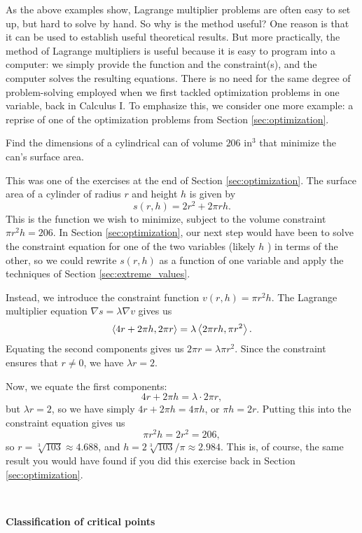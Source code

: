 As the above examples show, Lagrange multiplier problems are often easy to set up, but hard to solve by hand. So why is the method useful? One reason is that it can be used to establish useful theoretical results. But more practically, the method of Lagrange multipliers is useful because it is easy to program into a computer: we simply provide the function and the constraint(s), and the computer solves the resulting equations. There is no need for the same degree of problem-solving employed when we first tackled optimization problems in one variable, back in Calculus I. To emphasize this, we consider one more example: a reprise of one of the optimization problems from Section \ref{sec:optimization}.\pagebreak

{
Find the dimensions of a cylindrical can of volume $206 \text{ in}^3$ that minimize the can's surface area.
}
{
This was one of the exercises at the end of Section \ref{sec:optimization}. The surface area of a cylinder of radius $r$ and height $h$ is given by
\[
s(r,h) = 2r^2+2\pi rh.
\]
This is the function we wish to minimize, subject to the volume constraint $\pi r^2 h = 206$. In Section \ref{sec:optimization}, our next step would have been to solve the constraint equation for one of the two variables (likely $h$ ) in terms of the other, so we could rewrite $s(r,h)$ as a function of one variable and apply the techniques of Section \ref{sec:extreme_values}.

Instead, we introduce the constraint function $v(r,h)= \pi r^2 h$. The Lagrange multiplier equation $\nabla s = \lambda \nabla v$ gives us
\[
\left\langle 4r+2\pi h, 2\pi r\right\rangle = \lambda\left\langle 2\pi r h, \pi r^2\right\rangle.
\]
Equating the second components gives us $2\pi r = \lambda\pi r^2$. Since the constraint ensures that $r\neq 0$, we have $\lambda r = 2$.

Now, we equate the first components:
\[
4r+2\pi h = \lambda \cdot 2\pi r,
\]
but $\lambda r =2$, so we have simply $4r+2\pi h = 4\pi h$, or $\pi h = 2r$. Putting this into the constraint equation gives us
\[
\pi r^2 h = 2r^2 = 206,
\]
so $r=\sqrt[3]{103}\approx 4.688$, and $h=2\sqrt[3]{103}/\pi  \approx 2.984$. This is, of course, the same result you would have found if you did this exercise back in Section \ref{sec:optimization}.
}\\


\clearpage

\noindent\textbf{\large Classification of critical points}\\

